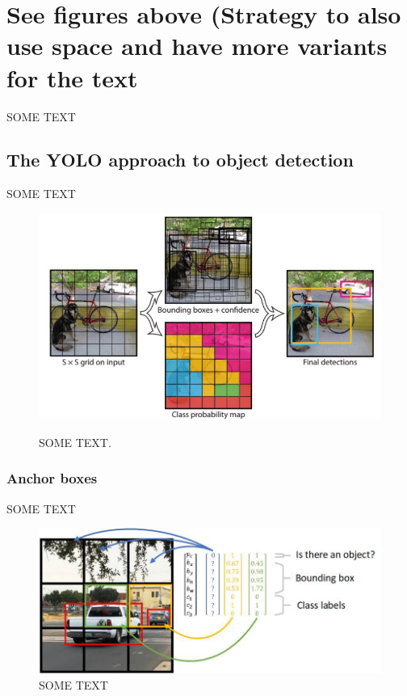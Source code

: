 \documentclass[a4paper]{article}
\begin{document}
\section{See figures above (Strategy to also use space and have more variants for the text}
SOME TEXT
\newline 
\subsection*{The YOLO approach to object detection}
SOME TEXT

\begin{figure}
\includegraphics[scale=0.35]{images/yolo_model}\label{fig:yolomodel}
\caption{SOME TEXT.}
\end{figure}


\subsubsection*{Anchor boxes}
SOME TEXT
\begin{figure}
\includegraphics[scale=0.35]{images/yolo_mechanics}
\caption{SOME TEXT}
\label{fig:cell}
\end{figure}
\end{document}
